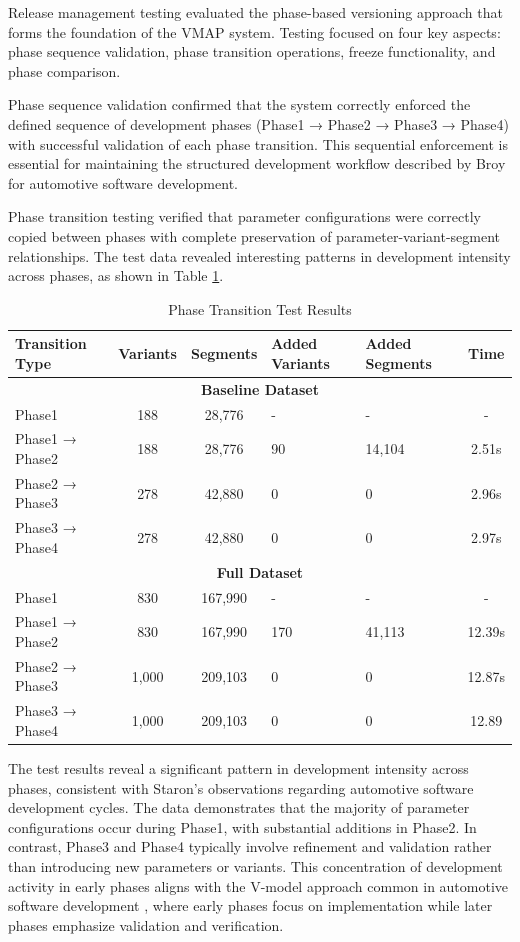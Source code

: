 Release management testing evaluated the phase-based versioning approach that forms the foundation of the \ac{VMAP} system. Testing focused on four key aspects: phase sequence validation, phase transition operations, freeze functionality, and phase comparison.

Phase sequence validation confirmed that the system correctly enforced the defined sequence of development phases (Phase1 → Phase2 → Phase3 → Phase4) with successful validation of each phase transition. This sequential enforcement is essential for maintaining the structured development workflow described by Broy \cite{broy2006challenges} for automotive software development.

Phase transition testing verified that parameter configurations were correctly copied between phases with complete preservation of parameter-variant-segment relationships. The test data revealed interesting patterns in development intensity across phases, as shown in Table \ref{tab:phase-transition-results}.

\begin{table}[h]
\centering
\caption{Phase Transition Test Results}
\label{tab:phase-transition-results}
\begin{tabular}{|l|c|c|p{2cm}|p{2cm}|c|}
\hline
\textbf{Transition Type} & \textbf{Variants} & \textbf{Segments} & \textbf{Added Variants} & \textbf{Added Segments} & \textbf{Time} \\
\hline
\multicolumn{6}{|c|}{\textbf{Baseline Dataset}} \\
\hline
Phase1 & 188 & 28,776 & - & - & - \\
\hline
Phase1 → Phase2 & 188 & 28,776 & 90 & 14,104 & 2.51s \\
\hline
Phase2 → Phase3 & 278 & 42,880 & 0 & 0 & 2.96s \\
\hline
Phase3 → Phase4 & 278 & 42,880 & 0 & 0 & 2.97s \\
\hline
\multicolumn{6}{|c|}{\textbf{Full Dataset}} \\
\hline
Phase1 & 830 & 167,990 & - & - & - \\
\hline
Phase1 → Phase2 & 830 & 167,990 & 170 & 41,113 & 12.39s \\
\hline
Phase2 → Phase3 & 1,000 & 209,103 & 0 & 0 & 12.87s \\
\hline
Phase3 → Phase4 & 1,000 & 209,103 & 0 & 0 & 12.89 \\
\hline
\end{tabular}
\end{table}

The test results reveal a significant pattern in development intensity across phases, consistent with Staron's observations \cite{staron2021automotive} regarding automotive software development cycles. The data demonstrates that the majority of parameter configurations occur during Phase1, with substantial additions in Phase2. In contrast, Phase3 and Phase4 typically involve refinement and validation rather than introducing new parameters or variants. This concentration of development activity in early phases aligns with the V-model approach common in automotive software development \cite{pretschner2007software}, where early phases focus on implementation while later phases emphasize validation and verification.

